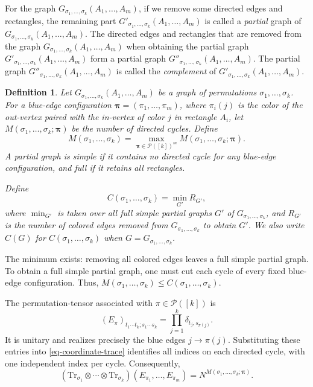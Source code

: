 \documentclass[12pt]{article}
\numberwithin{equation}{section}
\theoremstyle{plain}
\newtheorem{definition}[theorem]{Definition}
\def\cP{\mathcal P}
\def\Tr{\mathrm {Tr}}
\begin{document}
For the graph $G_{\sigma_1,\ldots,\sigma_k} (A_1,\ldots,A_m)$, if we remove some directed edges and rectangles, the remaining part $G'_{\sigma_1,\ldots,\sigma_k} (A_1,\ldots,A_m)$ is called a \emph{partial} graph of $G_{\sigma_1,\ldots,\sigma_k} (A_1,\ldots,A_m)$. The directed edges and rectangles that are removed from the graph $G_{\sigma_1,\ldots,\sigma_k} (A_1,\ldots,A_m)$ when obtaining the partial graph $G'_{\sigma_1,\ldots,\sigma_k} (A_1,\ldots,A_m)$ form a partial graph $G''_{\sigma_1,\ldots,\sigma_k} (A_1,\ldots,A_m)$. The partial graph $G''_{\sigma_1,\ldots,\sigma_k} (A_1,\ldots,A_m)$ is called the \emph{complement} of $G'_{\sigma_1,\ldots,\sigma_k} (A_1,\ldots,A_m)$.

\begin{definition}\label{def-cycle-cut}
Let $G_{\sigma_1,\ldots,\sigma_k}(A_1,\ldots,A_m)$ be a graph of permutations $\sigma_1,\ldots,\sigma_k$.
For a blue-edge configuration $\boldsymbol\pi=(\pi_1,\ldots,\pi_m)$, where $\pi_i(j)$ is the color of the out-vertex paired with the in-vertex of color $j$ in rectangle $A_i$, let $M(\sigma_1,\ldots,\sigma_k;\boldsymbol\pi)$ be the number of directed cycles.
Define
\[
M(\sigma_1,\ldots,\sigma_k)=\max_{\boldsymbol\pi\in\cP([k])^m}M(\sigma_1,\ldots,\sigma_k;\boldsymbol\pi).
\]
A partial graph is \emph{simple} if it contains no directed cycle for any blue-edge configuration, and \emph{full} if it retains all rectangles.

Define
\[
C(\sigma_1,\ldots,\sigma_k)=\min_{G'} R_{G'},
\]
where $\min_{G'}$ is taken over all full simple partial graphs $G'$ of $G_{\sigma_1,\ldots,\sigma_k}$, and $R_{G'}$ is the number of colored edges removed from $G_{\sigma_1,\ldots,\sigma_k}$ to obtain $G'$. We also write $C(G)$ for $C(\sigma_1,\ldots,\sigma_k)$ when $G=G_{\sigma_1,\ldots,\sigma_k}$.
\end{definition}
The minimum exists: removing all colored edges leaves a full simple partial graph. To obtain a full simple partial graph, one must cut each cycle of every fixed blue-edge configuration. Thus, $M(\sigma_1,\ldots,\sigma_k)\le C(\sigma_1,\ldots,\sigma_k)$.

The permutation-tensor associated with $\pi\in\cP([k])$ is
\begin{equation}\label{eq-permutation-tensor}
(E_\pi)_{t_1\cdots t_k;s_1\cdots s_k}
=\prod_{j=1}^k\delta_{t_j,s_{\pi(j)}}.
\end{equation}
It is unitary and realizes precisely the blue edges $j\to\pi(j)$. Substituting these entries into \eqref{eq-coordinate-trace} identifies all indices on each directed cycle, with one independent index per cycle. Consequently,
\begin{equation}\label{eq-coordinate-cycles}
(\Tr_{\sigma_1}\otimes\cdots\otimes\Tr_{\sigma_k})(E_{\pi_1},\ldots,E_{\pi_m})
=N^{M(\sigma_1,\ldots,\sigma_k;\boldsymbol\pi)}.
\end{equation}
\end{document}
